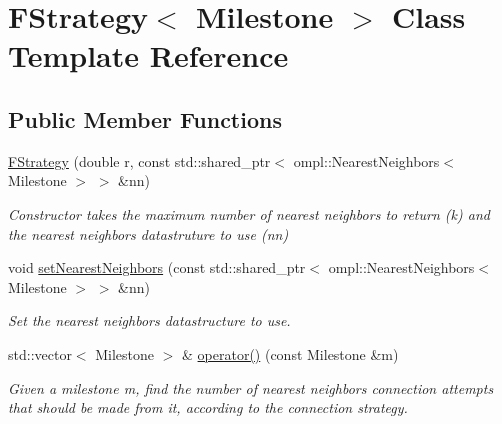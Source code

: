 \hypertarget{class_f_strategy}{\section{F\-Strategy$<$ Milestone $>$ Class Template Reference}
\label{class_f_strategy}
}
\subsection*{Public Member Functions}
\begin{DoxyCompactItemize}
\item 
\hypertarget{class_f_strategy_acc3f67217f85960534aa23f5cf82c3c9}{\hyperlink{class_f_strategy_acc3f67217f85960534aa23f5cf82c3c9}{F\-Strategy} (double r, const std\-::shared\-\_\-ptr$<$ ompl\-::\-Nearest\-Neighbors$<$ Milestone $>$ $>$ \&nn)}\label{class_f_strategy_acc3f67217f85960534aa23f5cf82c3c9}

\begin{DoxyCompactList}\small\item\em Constructor takes the maximum number of nearest neighbors to return ({\itshape k}) and the nearest neighbors datastruture to use ({\itshape nn}) \end{DoxyCompactList}\item 
\hypertarget{class_f_strategy_a9e80a30f6c323e9ce704d29b17719b26}{void \hyperlink{class_f_strategy_a9e80a30f6c323e9ce704d29b17719b26}{set\-Nearest\-Neighbors} (const std\-::shared\-\_\-ptr$<$ ompl\-::\-Nearest\-Neighbors$<$ Milestone $>$ $>$ \&nn)}\label{class_f_strategy_a9e80a30f6c323e9ce704d29b17719b26}

\begin{DoxyCompactList}\small\item\em Set the nearest neighbors datastructure to use. \end{DoxyCompactList}\item 
\hypertarget{class_f_strategy_a88be84fef1b1d69a20acf7186d923255}{std\-::vector$<$ Milestone $>$ \& \hyperlink{class_f_strategy_a88be84fef1b1d69a20acf7186d923255}{operator()} (const Milestone \&m)}\label{class_f_strategy_a88be84fef1b1d69a20acf7186d923255}

\begin{DoxyCompactList}\small\item\em Given a milestone {\itshape m}, find the number of nearest neighbors connection attempts that should be made from it, according to the connection strategy. \end{DoxyCompactList}\end{DoxyCompactItemize}
